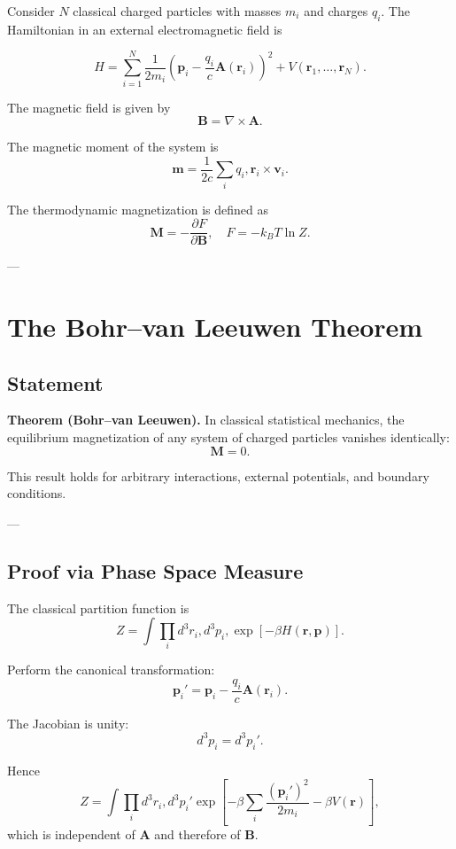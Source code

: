 \documentclass[11pt]{article}
\begin{document}
Consider $N$ classical charged particles with masses $m_i$ and charges $q_i$. The Hamiltonian in an external electromagnetic field is

\begin{equation}
H = \sum_{i=1}^{N} \frac{1}{2m_i}
\left( \mathbf{p}_i - \frac{q_i}{c}\mathbf{A}(\mathbf{r}_i) \right)^2
+ V(\mathbf{r}_1,\ldots,\mathbf{r}_N).
  \end{equation}

The magnetic field is given by
\[
\mathbf{B} = \nabla \times \mathbf{A}.
\]

The magnetic moment of the system is
\[
\mathbf{m} = \frac{1}{2c} \sum_i q_i, \mathbf{r}_i \times \mathbf{v}_i.
\]

The thermodynamic magnetization is defined as
\[
\mathbf{M} = -\frac{\partial F}{\partial \mathbf{B}},
\quad
F = -k_B T \ln Z.
\]

---

\section{The Bohr--van Leeuwen Theorem}

\subsection{Statement}

\textbf{Theorem (Bohr–van Leeuwen).}
In classical statistical mechanics, the equilibrium magnetization of any system of charged particles vanishes identically:
\[
\mathbf{M} = 0.
\]

This result holds for arbitrary interactions, external potentials, and boundary conditions.

---

\subsection{Proof via Phase Space Measure}

The classical partition function is
\[
Z = \int \prod_i d^3 r_i , d^3 p_i ,
\exp\left[-\beta H(\mathbf{r},\mathbf{p})\right].
\]

Perform the canonical transformation:
\[
\mathbf{p}_i' = \mathbf{p}_i - \frac{q_i}{c} \mathbf{A}(\mathbf{r}_i).
\]

The Jacobian is unity:
\[
d^3 p_i = d^3 p_i'.
\]

Hence
\[
Z = \int \prod_i d^3 r_i , d^3 p_i'
\exp\left[
-\beta \sum_i \frac{(\mathbf{p}_i')^2}{2m_i}
- \beta V(\mathbf{r})
  \right],
 \]
  which is independent of $\mathbf{A}$ and therefore of $\mathbf{B}$.
\end{document}
